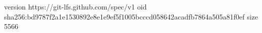 version https://git-lfs.github.com/spec/v1
oid sha256:bd9787f2a1e1530892e8e1e9ef5f1005bcccd058642acadfb7864a505a81f0ef
size 5566
